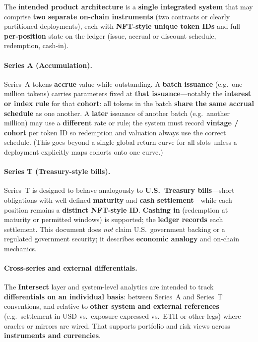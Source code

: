 \documentclass[11pt,a4paper]{article}
\begin{document}
The \textbf{intended product architecture} is a \textbf{single integrated system} that may comprise \textbf{two separate on-chain instruments} (two contracts or clearly partitioned deployments), each with \textbf{NFT-style unique token IDs} and full \textbf{per-position} state on the ledger (issue, accrual or discount schedule, redemption, cash-in).

\paragraph{Series \textbf{A} (Accumulation).}
Series~A tokens \textbf{accrue} value while outstanding. A \textbf{batch issuance} (e.g.\ one million tokens) carries parameters fixed at \textbf{that issuance}---notably the \textbf{interest or index rule} for that \textbf{cohort}: all tokens in the batch \textbf{share the same accrual schedule} as one another. A \textbf{later} issuance of another batch (e.g.\ another million) may use a \textbf{different} rate or rule; the system must record \textbf{vintage / cohort} per token ID so redemption and valuation always use the correct schedule. (This goes beyond a single global return curve for all slots unless a deployment explicitly maps cohorts onto one curve.)

\paragraph{Series \textbf{T} (Treasury-style bills).}
Series~T is designed to behave analogously to \textbf{U.S.\ Treasury bills}---short obligations with well-defined \textbf{maturity} and \textbf{cash settlement}---while each position remains a \textbf{distinct NFT-style ID}. \textbf{Cashing in} (redemption at maturity or permitted windows) is supported; the \textbf{ledger records} each settlement. This document does \emph{not} claim U.S.\ government backing or a regulated government security; it describes \textbf{economic analogy} and on-chain mechanics.

\paragraph{Cross-series and external differentials.}
The \textbf{Intersect} layer and system-level analytics are intended to track \textbf{differentials on an individual basis}: between Series~A and Series~T conventions, and relative to \textbf{other system and external references} (e.g.\ settlement in USD vs.\ exposure expressed vs.\ ETH or other legs) where oracles or mirrors are wired. That supports portfolio and risk views across \textbf{instruments and currencies}.
\end{document}
